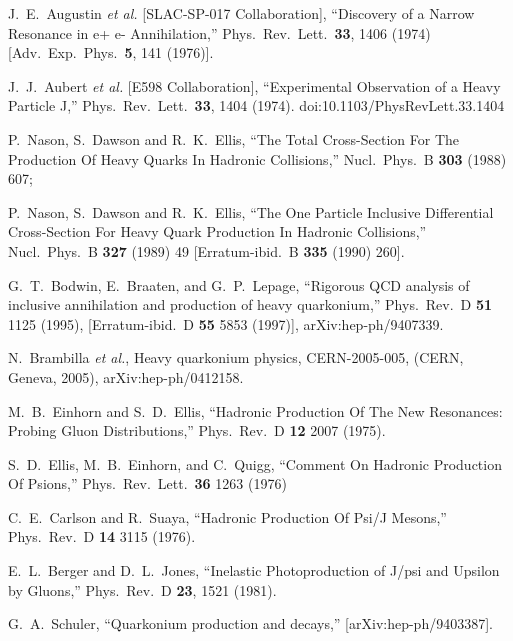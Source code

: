 \documentclass[aps,prc,preprint,superscriptaddress,showpacs,showkeys,amsmath]{revtex4-1}
\begin{document}
\noindent
\begin{thebibliography}{100}
\medskip

  J.~E.~Augustin {\it et al.} [SLAC-SP-017 Collaboration],
  ``Discovery of a Narrow Resonance in e+ e- Annihilation,''
  Phys.\ Rev.\ Lett.\  {\bf 33}, 1406 (1974)
  [Adv.\ Exp.\ Phys.\  {\bf 5}, 141 (1976)].

  J.~J.~Aubert {\it et al.} [E598 Collaboration],
  ``Experimental Observation of a Heavy Particle J,''
  Phys.\ Rev.\ Lett.\  {\bf 33}, 1404 (1974).
  doi:10.1103/PhysRevLett.33.1404
  
  P.~Nason, S.~Dawson and R.~K.~Ellis,
  ``The Total Cross-Section For The Production Of Heavy Quarks In Hadronic Collisions,''
  Nucl.\ Phys.\ B {\bf 303} (1988) 607;
  
  P.~Nason, S.~Dawson and R.~K.~Ellis,
  ``The One Particle Inclusive Differential Cross-Section For Heavy Quark Production In Hadronic Collisions,''
  Nucl.\ Phys.\ B {\bf 327} (1989) 49
  [Erratum-ibid.\ B {\bf 335} (1990) 260].

G.~T.~Bodwin, E.~Braaten, and G.~P.~Lepage,
``Rigorous QCD analysis of inclusive annihilation and production of heavy
quarkonium,''
Phys.\ Rev.\ D {\bf 51} 1125 (1995), 
[Erratum-ibid.\ D {\bf 55} 5853 (1997)],
arXiv:hep-ph/9407339.

  N.~Brambilla {\it et al.},
  Heavy quarkonium physics,
  CERN-2005-005, (CERN, Geneva, 2005),
   arXiv:hep-ph/0412158.



  M.~B.~Einhorn and S.~D.~Ellis,
  ``Hadronic Production Of The New Resonances: Probing Gluon Distributions,''
  Phys.\ Rev.\  D {\bf 12} 2007 (1975).

  S.~D.~Ellis, M.~B.~Einhorn, and C.~Quigg,
  ``Comment On Hadronic Production Of Psions,''
  Phys.\ Rev.\ Lett.\  {\bf 36} 1263 (1976)


  C.~E.~Carlson and R.~Suaya,
  ``Hadronic Production Of Psi/J Mesons,''
  Phys.\ Rev.\  D {\bf 14} 3115 (1976).
  

  E.~L.~Berger and D.~L.~Jones,
  ``Inelastic Photoproduction of J/psi and Upsilon by Gluons,''
  Phys.\ Rev.\ D {\bf 23}, 1521 (1981).

  G.~A.~Schuler,        
  ``Quarkonium production and decays,''
  [arXiv:hep-ph/9403387].



\end{thebibliography}
\end{document}
